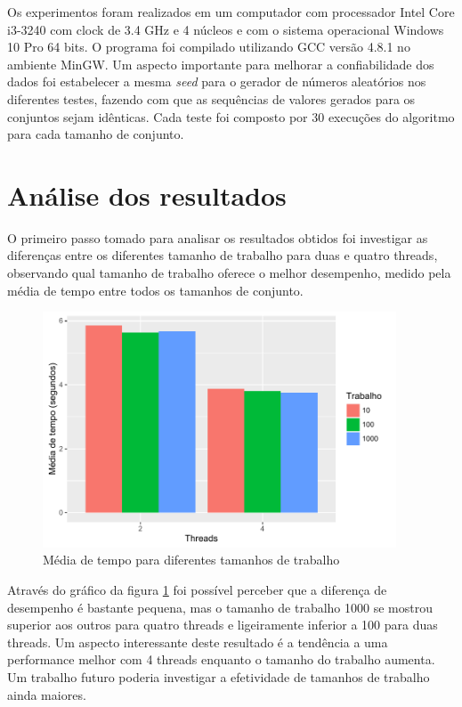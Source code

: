 \documentclass[12pt]{article}
\begin{document}
Os experimentos foram realizados em um computador com processador Intel Core i3-3240 com clock de 3.4 GHz e 4 núcleos e com o sistema operacional Windows 10 Pro 64 bits. O programa foi compilado utilizando GCC versão 4.8.1 no ambiente MinGW. Um aspecto importante para melhorar a confiabilidade dos dados foi estabelecer a mesma \textit{seed} para o gerador de números aleatórios nos diferentes testes, fazendo com que as sequências de valores gerados para os conjuntos sejam idênticas. Cada teste foi composto por 30 execuções do algoritmo para cada tamanho de conjunto.

\section{Análise dos resultados} \label{sec:results}

O primeiro passo tomado para analisar os resultados obtidos foi investigar as diferenças entre os diferentes tamanho de trabalho para duas e quatro threads, observando qual tamanho de trabalho oferece o melhor desempenho, medido pela média de tempo entre todos os tamanhos de conjunto.

\begin{figure}[ht]
    \centering
    \includegraphics[width=10.5cm]{chunks}
    \caption{Média de tempo para diferentes tamanhos de trabalho}
    \label{fig:chunks}
\end{figure}

Através do gráfico da figura \ref{fig:chunks} foi possível perceber que a diferença de desempenho é bastante pequena, mas o tamanho de trabalho 1000 se mostrou superior aos outros para quatro threads e ligeiramente inferior a 100 para duas threads. Um aspecto interessante deste resultado é a tendência a uma performance melhor com 4 threads enquanto o tamanho do trabalho aumenta. Um trabalho futuro poderia investigar a efetividade de tamanhos de trabalho ainda maiores.
\end{document}
